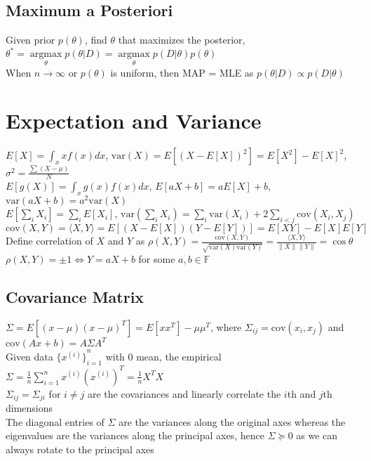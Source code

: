 \documentclass{article}
\newcommand{\V}{\mbox{var}}
\newcommand{\C}{\mbox{cov}}
\newcommand\inner[2]{\langle #1, #2 \rangle}
\DeclareMathOperator*{\argmax}{argmax}
\begin{document}
\subsection{Maximum a Posteriori}
Given prior $p(\theta)$, find $\theta$ that maximizes the posterior, $\theta^* = \argmax\limits_\theta p(\theta|D) = \argmax\limits_\theta p(D| \theta)p(\theta)$ \\
When $n \to \infty$ or $p(\theta)$ is uniform, then MAP = MLE as $p(\theta | D) \propto p(D|\theta)$

\section{Expectation and Variance}
$E[X] = \int_x x f(x)dx$, $\V(X) = E[(X-E[X])^2] = E[X^2] - E[X]^2$, $\sigma^2 = \frac{\sum (X - \mu)}{N}$ \\
$E[g(X)] = \int_x g(x) f(x)dx$, $E[aX + b] = aE[X] + b$, $\V(aX + b) = a^2\V(X)$\\
$E[\sum_i X_i] = \sum_i E[X_i]$, $\V(\sum_{i} X_i) = \sum_{i} \V(X_i) + 2\sum\limits_{i < j}\C(X_i, X_j)$ \\
$\C(X, Y) = \inner{X}{Y} = E[(X-E[X])(Y-E[Y])] = E[XY] - E[X]E[Y]$ \\
Define correlation of $X$ and $Y$ as $\rho(X, Y) = \frac{\C(X, Y)}{\sqrt{\V(X)\V(Y)}} = \frac{\langle X, Y \rangle}{\|X\| \|Y\|} = \cos\theta$ \\
$\rho(X,Y) =  \pm 1 \iff Y = aX + b$ for some $a, b \in \mathbb{F}$ 

\subsection{Covariance Matrix}
$\Sigma = E[(x - \mu)(x - \mu)^T] = E[x x^T] - \mu \mu^T$, where $\Sigma_{ij} = \C(x_i, x_j)$ and $\C(Ax + b) = A \Sigma A^T$ \\
Given data ${\{x^{(i)}\}}_{i=1}^n$ with 0 mean, the empirical $\Sigma = \frac{1}{n}\sum_{i=1}^n x^{(i)}(x^{(i)})^T = \frac{1}{n}X^TX$ \\
$\Sigma_{ij} = \Sigma_{ji}$ for $i \neq j$ are the covariances and linearly correlate the $i$th and $j$th dimensions \\
The diagonal entries of $ \Sigma$ are the variances along the original axes whereas the eigenvalues are the variances along the principal axes, hence $\Sigma \succeq 0$ as we can always rotate to the principal axes
\end{document}
